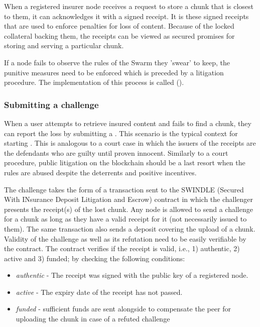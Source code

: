 When a registered insurer node receives a request to store a chunk that is closest to them, it can acknowledges it with a signed receipt. It is these signed receipts that are used to enforce penalties for loss of content. Because of the locked collateral backing them, the receipts  can be viewed as secured promises for storing and serving a particular chunk.

If a node fails to observe the rules of the Swarm they 'swear' to keep, the punitive measures need to be enforced which is preceded by a litigation procedure. The implementation of this process is called  ().


\subsubsection{Submitting a challenge}

When a user attempts to retrieve insured content and fails to find a chunk, they can report the loss by submitting a . This scenario is the typical context for starting . This is analogous to a court case in which the issuers of the receipts are the defendants who are guilty until proven innocent. Similarly to a court procedure, public litigation on the blockchain should be a last resort when the rules are abused despite the deterrents and positive incentives.


The challenge takes the form of a transaction sent to the SWINDLE (Secured With INsurance Deposit Litigation and Escrow) contract in which the challenger presents the receipt(s) of the lost chunk. Any node is allowed to send a challenge for a chunk as long as they have a valid receipt for it (not necessarily issued to them). The same transaction also sends a deposit covering the upload of a chunk. Validity of the challenge as well as its refutation need to be easily verifiable by the contract.
The contract verifies if the receipt is valid, i.e., 1) authentic, 2) active and 3) funded; by checking the following conditions:

\begin{itemize}
\item \emph{authentic} - The receipt was signed with the public key of a registered node.
\item \emph{active} - The expiry date of the receipt has not passed.
\item \emph{funded} - sufficient funds are sent alongside to compensate the peer for uploading the chunk in case of a refuted challenge
\end{itemize}

